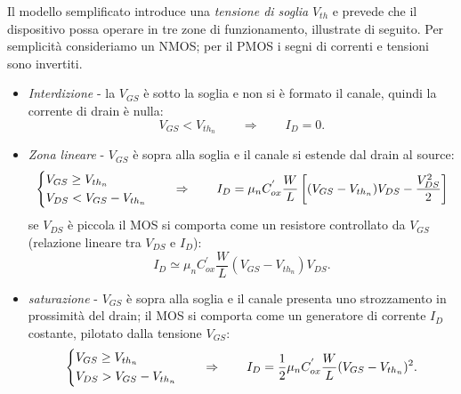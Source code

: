 Il modello semplificato introduce una \textit{tensione di soglia} $V_{th}$ e prevede che il dispositivo possa operare in tre zone di funzionamento, illustrate di seguito. Per semplicità consideriamo un NMOS; per il PMOS i segni di correnti e tensioni sono invertiti. 
\begin{itemize}
	\item \textit{Interdizione} - la $V_{GS}$ è sotto la soglia e non si è formato il canale, quindi la corrente di drain è nulla:
	\begin{equation}
	V_{GS} < V_{th_n} \qquad \Rightarrow \qquad I_D = 0 .
	\label{eq:eq_MOS_zonaInterdizione}
	\end{equation}
	
	\item \textit{Zona lineare} - $V_{GS}$ è sopra alla soglia e il canale si estende dal drain al source:
	\begin{equation}
	\begin{dcases}
	V_{GS} \geq V_{th_n} \\
	V_{DS}<V_{GS}-V_{th_n}
	\end{dcases}
	\qquad \Rightarrow \qquad I_{D} = \mu _{n} C^{'}_{ox} \frac{W}{L} \left[(V_{GS}-V_{th_n})V_{DS} - \frac{V_{DS}^2}{2} \right]
	\label{eq:eq_MOS_zonaLineare}
	\end{equation}
	se $V_{DS}$ è piccola il MOS si comporta come un resistore controllato da $V_{GS}$ (relazione lineare tra $V_{DS}$ e $I_D$):
	\begin{equation}
	I_{D} \simeq \mu _{n} C^{'}_{ox} \frac{W}{L} (V_{GS}-V_{th_n})V_{DS} .
	\label{eq:eq_MOS_zonaLineareApprox}
	\end{equation}
	
	\item \textit{saturazione} - $V_{GS}$ è sopra alla soglia e il canale presenta uno strozzamento in prossimità del drain; il MOS si comporta come un generatore di corrente $I_D$ costante, pilotato dalla tensione $V_{GS}$:
	\begin{equation}
	\begin{dcases}
	V_{GS} \geq V_{th_n} \\
	V_{DS} > V_{GS}-V_{th_n}
	\end{dcases}
	\qquad \Rightarrow \qquad 	I_{D} = \frac{1}{2} \mu _{n} C^{'}_{ox} \frac{W}{L} (V_{GS}-V_{th_n})^2 .
	\label{eq:eq_MOS_zonaSaturazione}
	\end{equation}
\end{itemize}

